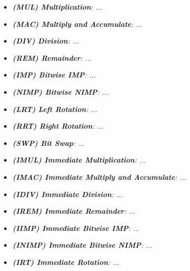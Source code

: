        \begin{multicols}{2}

            \begin{itemize}

                \item \textit{\textbf{(MUL) Multiplication}: ...}

                \item \textit{\textbf{(MAC) Multiply and Accumulate}: ...}

                \item \textit{\textbf{(DIV) Division}: ...}
                
                \item \textit{\textbf{(REM) Remainder}: ...}

                \item \textit{\textbf{(IMP) Bitwise IMP}: ...}

                \item \textit{\textbf{(NIMP) Bitwise NIMP}: ...}

                \item \textit{\textbf{(LRT) Left Rotation}: ...}
                
                \item \textit{\textbf{(RRT) Right Rotation}: ...}

                \item \textit{\textbf{(SWP) Bit Swap}: ...}

                \item \textit{\textbf{(IMUL) Immediate Multiplication}: ...}

                \item \textit{\textbf{(IMAC) Immediate Multiply and Accumulate}: ...}
                
                \item \textit{\textbf{(IDIV) Immediate Division}: ...}

                \item \textit{\textbf{(IREM) Immediate Remainder}: ...}

                \item \textit{\textbf{(IIMP) Immediate Bitwise IMP}: ...}

                \item \textit{\textbf{(INIMP) Immediate Bitwise NIMP}: ...}
                
                \item \textit{\textbf{(IRT) Immediate Rotation}: ...}


\end{itemize}
\end{multicols}
